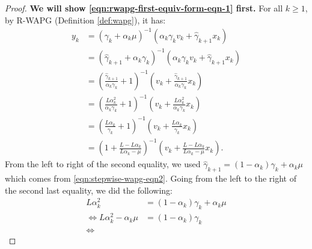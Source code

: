\documentclass[12pt]{article}
\begin{document}
        \begin{proof}
            \textbf{We will show \eqref{eqn:rwapg-first-equiv-form-eqn-1} first.}
            For all $k \ge 1$, by R-WAPG (Definition \ref{def:wapg}), it has:
            \begin{align*}
                y_{k} &=
                (\gamma_k + \alpha_k \mu)^{-1}
                (\alpha_k \gamma_k v_k + \hat \gamma_{k + 1}x_k)
                \\
                &=
                (\hat \gamma_{k + 1} + \alpha_k \gamma_k)^{-1}
                (\alpha_k \gamma_k v_k + \hat \gamma_{k + 1}x_k)
                \\
                &=
                \left(
                    \frac{\hat \gamma_{k + 1}}{\alpha_k\gamma_k} + 1
                \right)^{-1}
                \left(
                    v_k + \frac{\hat \gamma_{k + 1}}{\alpha_k \gamma_k} x_k
                \right)
                \\
                &=
                \left(
                    \frac{L\alpha_k^2}{\alpha_k\gamma_k} + 1
                \right)^{-1}
                \left(
                    v_k + \frac{L\alpha_k^2}{\alpha_k \gamma_k} x_k
                \right)
                \\
                &=
                \left(
                    \frac{L\alpha_k}{\gamma_k} + 1
                \right)^{-1}
                \left(
                    v_k + \frac{L\alpha_k}{ \gamma_k} x_k
                \right)
                \\
                &=
                \left(
                    1 + \frac{L - L \alpha_k}{L \alpha_k - \mu}
                \right)^{-1}
                \left(
                    v_k +
                    \frac{L - L \alpha_k}{L \alpha_k - \mu} x_k
                \right).
            \end{align*}
            From the left to right of the second equality, we used $\hat \gamma_{k + 1} = (1 - \alpha_k)\gamma_k + \alpha_k\mu$ which comes from \eqref{eqn:stepwise-wapg-eqn2}.
            Going from the left to the right of the second last equality, we did the following:
            \begin{align*}
                L\alpha_k^2 &=
                (1 - \alpha_k)\gamma_k + \alpha_k \mu
                \\
                \iff
                L \alpha_k^2 - \alpha_k\mu &=
                (1 - \alpha_k)\gamma_k
                \\
                \iff

\end{align*}
\end{proof}
\end{document}
